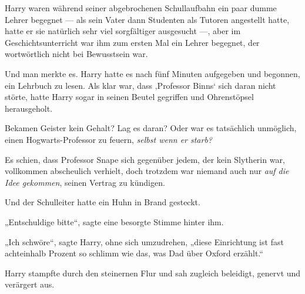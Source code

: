 Harry waren während seiner abgebrochenen Schullaufbahn ein paar dumme Lehrer begegnet — als sein Vater dann Studenten als Tutoren angestellt hatte, hatte er sie natürlich sehr viel sorgfältiger ausgesucht —, aber im Geschichtsunterricht war ihm zum ersten Mal ein Lehrer begegnet, der wortwörtlich nicht bei Bewusstsein war.

Und man merkte es. Harry hatte es nach fünf Minuten aufgegeben und begonnen, ein Lehrbuch zu lesen. Als klar war, dass ‚Professor Binns‘ sich daran nicht störte, hatte Harry sogar in seinen Beutel gegriffen und Ohrenstöpsel herausgeholt.

Bekamen Geister kein Gehalt? Lag es daran? Oder war es tatsächlich unmöglich, einen Hogwarts-Professor zu feuern, \emph{selbst wenn er starb?}

Es schien, dass Professor Snape sich gegenüber jedem, der kein Slytherin war, vollkommen abscheulich verhielt, doch trotzdem war niemand auch nur \emph{auf die Idee gekommen}, seinen Vertrag zu kündigen.

Und der Schulleiter hatte ein Huhn in Brand gesteckt.

„Entschuldige bitte“, sagte eine besorgte Stimme hinter ihm.

„Ich schwöre“, sagte Harry, ohne sich umzudrehen, „diese Einrichtung ist fast achteinhalb Prozent so schlimm wie das, was Dad über Oxford erzählt.“

\later

Harry stampfte durch den steinernen Flur und sah zugleich beleidigt, genervt und verärgert aus.

